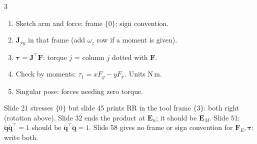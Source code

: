 \begin{multicols}{3}
\begin{worked}[$L=(0.5,0.4)$, $\mathbf q=(30^\circ,60^\circ)$; $\mathbf J^\top=\begin{bmatrix}-0.65&0.4330\\-0.4&0\end{bmatrix}$]
\end{worked}
\begin{recipe}
\begin{enumerate}
\item Sketch arm and force; frame $\{0\}$; sign convention.
\item $\mathbf J_{xy}$ in that frame (add $\omega_z$ row if a moment is given).
\item $\boldsymbol\tau=\mathbf J^\top\mathbf F$: torque $j$ = column $j$ dotted with $\mathbf F$.
\item Check by moments: $\tau_1=xF_y-yF_x$. Units N\,m.
\item Singular pose: forces needing zero torque.
\end{enumerate}
\end{recipe}
\begin{slideerr}[slides 21/45, 32, 51, 58]
Slide 21 stresses $\{0\}$ but slide 45 prints RR in the tool frame $\{3\}$: both right (rotation above). Slide 32 ends the product at $\mathbf E_n$; it should be $\mathbf E_M$. Slide 51: $\dot{\mathbf q}\dot{\mathbf q}^\top=1$ should be $\dot{\mathbf q}^\top\dot{\mathbf q}=1$. Slide 58 gives no frame or sign convention for $\mathbf F_E,\boldsymbol\tau$: write both.
\end{slideerr}


\end{multicols}
